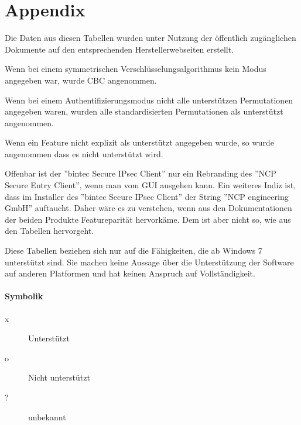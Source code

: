 



\section{Appendix}
\label{sec:appendix}
Die Daten aus diesen Tabellen wurden unter Nutzung der öffentlich zugänglichen
Dokumente auf den entsprechenden Herstellerwebseiten erstellt.

Wenn bei einem symmetrischen Verschlüsselungsalgorithmus kein Modus angegeben
war, wurde \ac{CBC} angenommen.

Wenn bei einem Authentifizierungsmodus nicht alle unterstützen Permutationen
angegeben waren, wurden alle standardisierten Permutationen als unterstützt 
angenommen.

Wenn ein Feature nicht explizit als unterstützt angegeben wurde, so wurde angenommen
dass es nicht unterstützt wird.

Offenbar ist der ''bintec Secure IPsec Client'' nur ein Rebranding des ''NCP Secure Entry Client'',
wenn man vom \ac{GUI} ausgehen kann. 
Ein weiteres Indiz ist, dass im Installer des ''bintec Secure IPsec Client''
der String ''NCP engineering GmbH'' auftaucht. Daher wäre es zu verstehen,
wenn aus den Dokumentationen der beiden Produkte Featureparität hervorkäme.
Dem ist aber nicht so, wie aus den Tabellen hervorgeht.

Diese Tabellen beziehen sich nur auf die Fähigkeiten, die ab Windows 7 unterstützt sind.
Sie machen keine Aussage über die Unterstützung der Software auf anderen Platformen
und hat keinen Anspruch auf Vollständigkeit.

\paragraph{Symbolik}
\begin{description}
\item[x] Unterstützt
\item[o] Nicht unterstützt
\item[?] unbekannt
\end{description}
